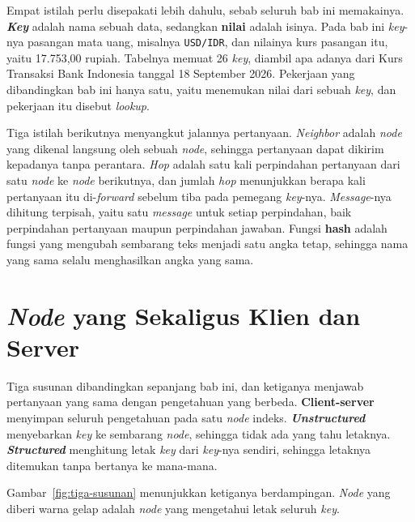 Empat istilah perlu disepakati lebih dahulu, sebab seluruh bab ini memakainya.
\textbf{\textit{Key}} adalah nama sebuah data, sedangkan \textbf{nilai} adalah isinya.
Pada bab ini \textit{key}-nya pasangan mata uang, misalnya \texttt{USD/IDR}, dan
nilainya kurs pasangan itu, yaitu 17.753,00 rupiah. Tabelnya memuat 26 \textit{key},
diambil apa adanya dari Kurs Transaksi Bank Indonesia tanggal 18 September 2026.
Pekerjaan yang dibandingkan bab ini hanya satu, yaitu menemukan nilai dari
sebuah \textit{key}, dan pekerjaan itu disebut \textit{lookup}.

Tiga istilah berikutnya menyangkut jalannya pertanyaan.
\textit{Neighbor}
adalah \textit{node} yang dikenal langsung oleh sebuah \textit{node}, sehingga
pertanyaan dapat dikirim kepadanya tanpa perantara. \textit{Hop}
adalah satu
kali perpindahan pertanyaan dari satu \textit{node} ke \textit{node}
berikutnya, dan jumlah \textit{hop} menunjukkan berapa kali pertanyaan itu
di-\textit{forward} sebelum tiba pada pemegang \textit{key}-nya. \textit{Message}-nya dihitung terpisah, yaitu
satu \textit{message} untuk setiap perpindahan, baik perpindahan pertanyaan maupun
perpindahan jawaban. Fungsi \textbf{hash} adalah fungsi
yang mengubah sembarang teks menjadi satu angka tetap, sehingga nama yang sama
selalu menghasilkan angka yang sama.

\section{\textit{Node} yang Sekaligus Klien dan Server}

Tiga susunan dibandingkan sepanjang bab ini, dan ketiganya menjawab pertanyaan
yang sama dengan pengetahuan yang berbeda. \textbf{Client-server} menyimpan
seluruh pengetahuan pada satu \textit{node} indeks.
\textbf{\textit{Unstructured}}
menyebarkan \textit{key} ke sembarang \textit{node}, sehingga tidak ada yang tahu letaknya.
\textbf{\textit{Structured}} menghitung letak
\textit{key} dari \textit{key}-nya sendiri, sehingga
letaknya ditemukan tanpa bertanya ke mana-mana.

Gambar~\ref{fig:tiga-susunan} menunjukkan ketiganya berdampingan. \textit{Node} yang
diberi warna gelap adalah \textit{node} yang mengetahui letak seluruh \textit{key}.


